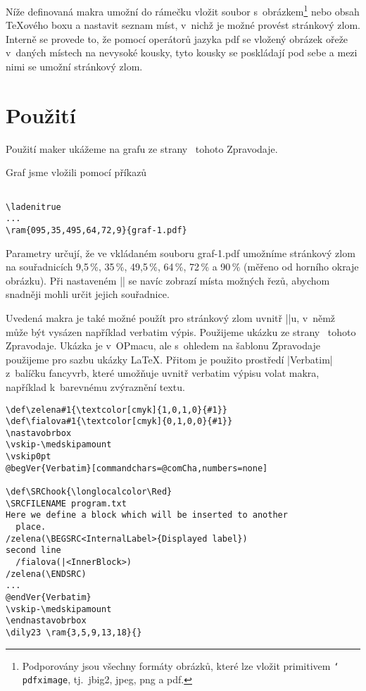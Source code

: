 \documentclass{csbulletin}
\def\p#1{\texttt{\char`\\#1}}
\def\soub#1{{\sf#1}}
\def\mTODO#1{\marginpar{\hbox{\color{red}\hskip-1cm\bf TODO\hskip3cm\bf TODO}}}
\begin{document}
Níže definovaná makra umožní do rámečku vložit soubor s~obrázkem\footnote{Podporovány jsou všechny formáty obrázků, které lze vložit primitivem \p{pdfximage}, tj.~\soub{jbig2}, \soub{jpeg}, \soub{png} a \soub{pdf}.} nebo obsah \TeX ového boxu a nastavit seznam míst, v~nichž je možné provést stránkový zlom. Interně se provede to, že pomocí operátorů jazyka pdf se vložený obrázek ořeže v~daných místech na nevysoké kousky, tyto kousky se poskládají pod sebe a mezi nimi se umožní stránkový zlom.

\JSvvvskip

\section{Použití}

Použití maker ukážeme na grafu ze strany~\mTODO{aktualizovat podle skutečnosti}{\bf??} tohoto Zpravodaje.

\ladenitrue
{}

\noindent
Graf jsme vložili pomocí příkazů
\begin{Verbatim}[numbers=none]

\ladenitrue
...
\ram{095,35,495,64,72,9}{graf-1.pdf}
\end{Verbatim}
\noindent
Parametry určují, že ve vkládaném souboru \soub{graf-1.pdf} umožníme stránkový zlom na souřadnicích 9,5\,\%, 35\,\%, 49,5\,\%, 64\,\%, 72\,\% a 90\,\% (měřeno od horního okraje obrázku). Při nastaveném |\ladenitrue| se navíc zobrazí místa možných řezů, abychom snadněji mohli určit jejich souřadnice.

\def\nastavobrbox{\setbox\obrbox\vbox\bgroup
  \hsize\dimexpr\hsize-2\hodstup\relax}
\def\endnastavobrbox{\egroup}

Uvedená makra je také možné použít pro stránkový zlom uvnitř |\vbox|u, v~němž může být vysázen například verbatim výpis. Použijeme ukázku ze strany~\mTODO{aktualizovat podle skutečnosti}{\bf??} tohoto Zpravodaje. Ukázka je v~OPmacu, ale s~ohledem na šablonu Zpravodaje použijeme pro sazbu ukázky \LaTeX. Přitom je použito prostředí |Verbatim| z~balíčku \soub{fancyvrb}, které umožňuje uvnitř verbatim výpisu volat makra, například k~barevnému zvýraznění textu.

\def\begVer{\char`\\begin}
\def\comCha{/()}
\def\endVer{\char`\\end}
\begin{Verbatim}[commandchars=@QW,numbers=none]
\def\zelena#1{\textcolor[cmyk]{1,0,1,0}{#1}}
\def\fialova#1{\textcolor[cmyk]{0,1,0,0}{#1}}
\nastavobrbox
\vskip-\medskipamount
\vskip0pt
@begVer{Verbatim}[commandchars=@comCha,numbers=none]

\def\SRChook{\longlocalcolor\Red}
\SRCFILENAME program.txt
Here we define a block which will be inserted to another
  place.
/zelena(\BEGSRC<InternalLabel>{Displayed label})
second line
  /fialova(|<InnerBlock>)
/zelena(\ENDSRC)
...
@endVer{Verbatim}
\vskip-\medskipamount
\endnastavobrbox
\dily23 \ram{3,5,9,13,18}{}
\end{Verbatim}
\end{document}
